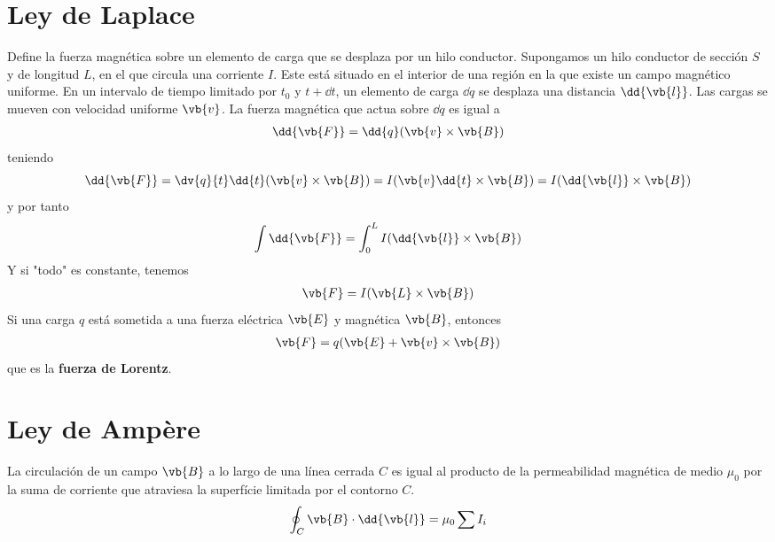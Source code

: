 \documentclass{./FisicaII.tex}
\begin{document}
\section{Ley de Laplace}
Define la fuerza magnética sobre un elemento de carga que se desplaza por un hilo
conductor. Supongamos un hilo conductor de sección \(S\) y de longitud \(L\),
en el que circula una corriente \(I\). Este está situado en el interior de una región
en la que existe un campo magnético uniforme. En un intervalo de tiempo limitado por
\(t_{0}\) y \(t+ \dd{t}\), un elemento de carga \( \dd{q}\) se desplaza una distancia
\( \dd{\vb{l}}\). Las cargas se mueven con velocidad uniforme \(\vb{v}\). La fuerza
magnética que actua sobre \( \dd{q}\) es igual a
\begin{equation}
    \begin{split}
        \dd{\vb{F}} = \dd{q}(\vb{v} \times \vb{B})
    \end{split}
\end{equation}
teniendo
\[
    \dd{\vb{F}} = \dv{q}{t} \dd{t} (\vb{v} \times \vb{B}) =
    I ( \vb{v} \dd{t} \times \vb{B}) = I ( \dd{\vb{l}} \times \vb{B})
\]
y por tanto
\[
    \int \dd{\vb{F}} = \int_{0}^L I ( \dd{\vb{l}} \times \vb{B})
\]
Y si "todo" es constante, tenemos
\begin{equation}
    \begin{split}
        \vb{F} = I(\vb{L} \times \vb{B})
    \end{split}
\end{equation}
Si una carga \(q\) está sometida a una fuerza eléctrica \(\vb{E}\) y magnética \(\vb{B}\),
entonces
\begin{equation}
    \begin{split}
        \vb{F} = q(\vb{E} + \vb{v} \times \vb{B})
    \end{split}
\end{equation}
que es la \textbf{fuerza de Lorentz}.
\section{Ley de Ampère}
La circulación de un campo \(\vb{B}\) a lo largo de una línea cerrada \(C\) es igual al
producto de la permeabilidad magnética de medio \(\mu_{0}\) por la suma de corriente que
atraviesa la superfície limitada por el contorno \(C\).
\begin{equation}
    \begin{split}
        \oint_{C} \vb{B} \cdot \dd{\vb{l}} = \mu_{0} \sum  I_{i}
    \end{split}
\end{equation}
\end{document}
